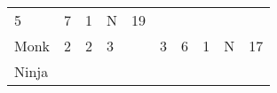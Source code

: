 \documentclass[12pt]{article}
\newcommand{\indexClass}[1]{\index{#1}}
\newcommand{\class}[1]{#1\indexClass{#1}}
\begin{document}
\begin{longtable}[]{@{}llllllllll@{}}
\begin{minipage}[t]{0.06\columnwidth}\raggedright\strut
5
\strut\end{minipage} &
\begin{minipage}[t]{0.06\columnwidth}\raggedright\strut
7
\strut\end{minipage} &
\begin{minipage}[t]{0.06\columnwidth}\raggedright\strut
1
\strut\end{minipage} &
\begin{minipage}[t]{0.07\columnwidth}\raggedright\strut
N
\strut\end{minipage} &
\begin{minipage}[t]{0.08\columnwidth}\raggedright\strut
19
\strut\end{minipage}\tabularnewline
\begin{minipage}[t]{0.13\columnwidth}\raggedright\strut
\class{Monk}
\strut\end{minipage} &
\begin{minipage}[t]{0.06\columnwidth}\raggedright\strut
2
\strut\end{minipage} &
\begin{minipage}[t]{0.06\columnwidth}\raggedright\strut
2
\strut\end{minipage} &
\begin{minipage}[t]{0.06\columnwidth}\raggedright\strut
3
\strut\end{minipage} &
\begin{minipage}[t]{0.06\columnwidth}\raggedright\strut
\strut\end{minipage} &
\begin{minipage}[t]{0.06\columnwidth}\raggedright\strut
3
\strut\end{minipage} &
\begin{minipage}[t]{0.06\columnwidth}\raggedright\strut
6
\strut\end{minipage} &
\begin{minipage}[t]{0.06\columnwidth}\raggedright\strut
1
\strut\end{minipage} &
\begin{minipage}[t]{0.07\columnwidth}\raggedright\strut
N
\strut\end{minipage} &
\begin{minipage}[t]{0.08\columnwidth}\raggedright\strut
17
\strut\end{minipage}\tabularnewline
\begin{minipage}[t]{0.13\columnwidth}\raggedright\strut
\class{Ninja}
\strut\end{minipage} &

\end{longtable}
\end{document}
